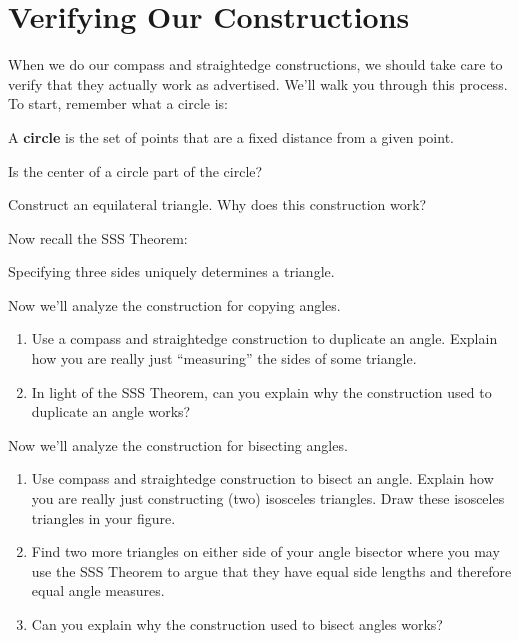 \newpage
\section{Verifying Our Constructions}


When we do our compass and straightedge constructions, we should take
care to verify that they actually work as advertised. We'll walk you
through this process. To start, remember what a circle is:

\begin{definition} 
A \textbf{circle} is the set of points that are a fixed distance from
a given point.
\end{definition}

\begin{prob} Is the center of a circle part of the circle?
\end{prob}

\begin{prob} 
Construct an equilateral triangle.  Why does this construction work?
\end{prob}




Now recall the SSS Theorem:

\begin{theorem}[SSS] 
Specifying three sides uniquely determines a triangle.
\end{theorem}



\begin{prob} Now we'll analyze the construction for copying angles. 
\begin{enumerate}
\item Use a compass and straightedge construction to duplicate an
  angle. Explain how you are really just ``measuring'' the sides of
  some triangle.
\item In light of the SSS Theorem, can you explain why the
  construction used to duplicate an angle works?
\end{enumerate}
\end{prob}


\begin{prob} Now we'll analyze the construction for bisecting angles.
\begin{enumerate}
\item Use compass and straightedge construction to bisect an
  angle. Explain how you are really just constructing (two)
  isosceles triangles. Draw these isosceles triangles in your figure.
\item Find two more triangles on either side of your angle bisector where
  you may use the SSS Theorem to argue that they have equal side
  lengths and therefore equal angle measures.
\item Can you explain why the construction used to bisect angles
  works?
\end{enumerate}
\end{prob}


